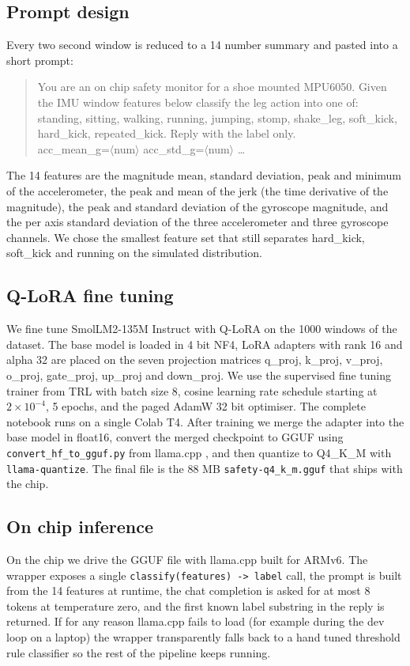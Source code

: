 \documentclass[conference]{IEEEtran}
\begin{document}
\subsection{Prompt design}
Every two second window is reduced to a 14 number summary and pasted into a short prompt:
\begin{quote}\small\ttfamily
You are an on chip safety monitor for a shoe mounted MPU6050. Given the IMU window features below classify the leg action into one of: standing, sitting, walking, running, jumping, stomp, shake\_leg, soft\_kick, hard\_kick, repeated\_kick. Reply with the label only.\\
acc\_mean\_g=$\langle$num$\rangle$ acc\_std\_g=$\langle$num$\rangle$ \dots
\end{quote}
The 14 features are the magnitude mean, standard deviation, peak and minimum of the accelerometer, the peak and mean of the jerk (the time derivative of the magnitude), the peak and standard deviation of the gyroscope magnitude, and the per axis standard deviation of the three accelerometer and three gyroscope channels. We chose the smallest feature set that still separates hard\_kick, soft\_kick and running on the simulated distribution.

\subsection{Q-LoRA fine tuning}
We fine tune SmolLM2-135M Instruct \cite{allal2025smollm2} with Q-LoRA \cite{hu2022lora, dettmers2023qlora} on the 1000 windows of the dataset. The base model is loaded in 4 bit NF4, LoRA adapters with rank 16 and alpha 32 are placed on the seven projection matrices q\_proj, k\_proj, v\_proj, o\_proj, gate\_proj, up\_proj and down\_proj. We use the supervised fine tuning trainer from TRL with batch size 8, cosine learning rate schedule starting at $2 \times 10^{-4}$, 5 epochs, and the paged AdamW 32 bit optimiser. The complete notebook runs on a single Colab T4. After training we merge the adapter into the base model in float16, convert the merged checkpoint to GGUF using \texttt{convert\_hf\_to\_gguf.py} from llama.cpp \cite{gerganov2024llamacpp}, and then quantize to Q4\_K\_M with \texttt{llama-quantize}. The final file is the 88 MB \texttt{safety-q4\_k\_m.gguf} that ships with the chip.

\subsection{On chip inference}
On the chip we drive the GGUF file with llama.cpp built for ARMv6. The wrapper exposes a single \texttt{classify(features) -> label} call, the prompt is built from the 14 features at runtime, the chat completion is asked for at most 8 tokens at temperature zero, and the first known label substring in the reply is returned. If for any reason llama.cpp fails to load (for example during the dev loop on a laptop) the wrapper transparently falls back to a hand tuned threshold rule classifier so the rest of the pipeline keeps running.
\end{document}

